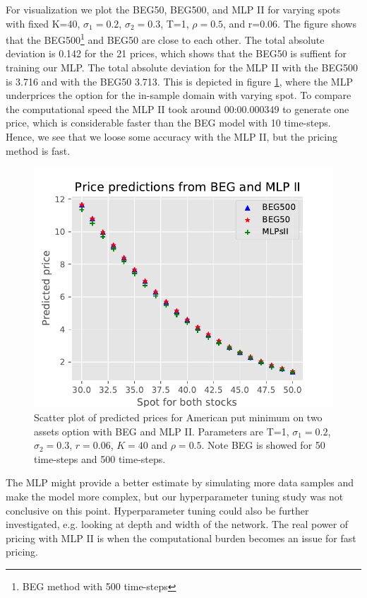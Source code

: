 For visualization we plot the BEG50, BEG500, and MLP II for varying spots with fixed K=40, $\sigma_1=0.2$, $\sigma_2=0.3$, T=1, $\rho=0.5$,  and r=0.06. The figure shows that the BEG500\footnote{BEG method with 500 time-steps} and BEG50 are close to each other. The total absolute deviation is 0.142 for the 21 prices, which shows that the BEG50 is suffient for training our MLP. The total absolute deviation for the MLP II with the BEG500 is 3.716 and with the BEG50 3.713. This is depicted in figure \ref{fig:BEGMLPII}, where the MLP underprices the option for the in-sample domain with varying spot. To compare the computational speed the MLP II took around 00:00.000349 to generate one price, which is considerable faster than the BEG model with 10 time-steps. Hence, we see that we loose some accuracy with the MLP II, but the pricing method is fast. 

\begin{figure}[H]
\centering
\includegraphics{Figures/compareBEGMLPsII.pdf}
\decoRule
\caption[Compare BEG and MLP II]{Scatter plot of predicted prices for American put minimum on two assets option with BEG and MLP II. Parameters are T=1, $\sigma_1=0.2$, $\sigma_2=0.3$, $r=0.06$, $K=40$ and $\rho=0.5$. Note BEG is showed for 50 time-steps and 500 time-steps.}
\label{fig:BEGMLPII}
\end{figure}

The MLP might provide a better estimate by simulating more data samples and make the model more complex, but our hyperparameter tuning study was not conclusive on this point. Hyperparameter tuning could also be further investigated, e.g. looking at depth and width of the network. The real power of pricing with MLP II is when the computational burden becomes an issue for fast pricing. 

